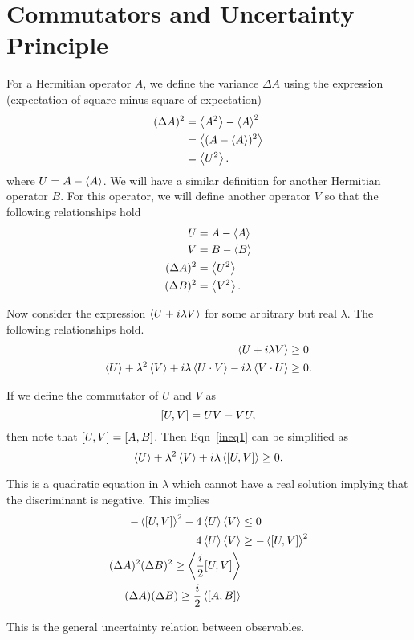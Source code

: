 \section{Commutators and  Uncertainty Principle}
For a Hermitian operator $A$, we define the variance $\Delta A$ using
the expression (expectation of square minus square of expectation)
\begin{equation*}
  \begin{split}
    (\Delta A)^2 & =  \expval{A^2} - \expval{A}^2 \\
                 & =  \expval{(A-\expval{A})^2} \\
                 & =  \expval{U^2}.
  \end{split}
\end{equation*}
where $U = A-\expval{A}$. We will have a similar definition for
another Hermitian operator $B$. For this operator, we will define
another operator $V$ so that the following relationships hold
\begin{equation*}
  \begin{split}
    U & = A - \expval{A} \\
    V & = B - \expval{B} \\
    (\Delta A)^2 & = \expval{U^2} \\
    (\Delta B)^2 & = \expval{V^2}.
  \end{split}
\end{equation*}

Now consider the expression $\expval{U + i\lambda V}$ for some
arbitrary but real $\lambda$. The following relationships hold.
\begin{equation}\label{ineq1}
\begin{split}
  \expval{U + i\lambda V} & \ge 0 \\
  \expval{U} + \lambda^2\expval{V} +
  i\lambda\expval{U\cdot V} - i\lambda\expval{V\cdot U} &
  \ge 0. 
\end{split}
\end{equation}

If we define the commutator of $U$ and $V$ as
\[
\commutator{U}{V} = UV - VU,
\]
then note that $\commutator{U}{V} = \commutator{A}{B}$. Then
Eqn~\ref{ineq1} can be simplified as
\begin{equation*}
  \expval{U} + \lambda^2\expval{V} + i\lambda\expval{\commutator{U}{V}} \ge 0.
\end{equation*}

This is a quadratic equation in $\lambda$ which cannot have a real
solution implying that the discriminant is negative. This implies
\begin{equation*}
  \begin{split}
    -\expval{\commutator{U}{V}}^2 -4\expval{U}\expval{V} & \le 0 \\
    4\expval{U}\expval{V} & \ge -\expval{\commutator{U}{V}}^2 \\
    (\Delta A)^2(\Delta B)^2 \ge \expval{\frac{i}{2}\commutator{U}{V}}
    \\
    (\Delta A)(\Delta B) \ge \frac{i}{2}\expval{\commutator{A}{B}}
  \end{split}
\end{equation*}

This is the general uncertainty relation between observables.
